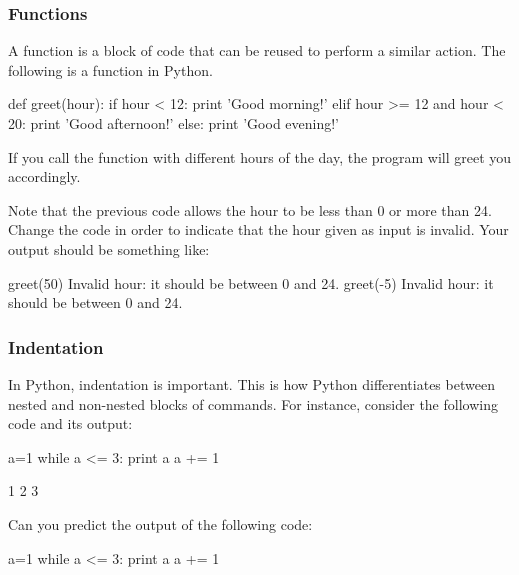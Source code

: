  
\subsubsection{Functions}

A function is a block of code that can be reused to perform a similar action. The following is a function in Python. 

\begin{python}
def greet(hour):
    if hour < 12:
        print 'Good morning!'
    elif hour >= 12 and hour < 20:
        print 'Good afternoon!'
    else:
        print 'Good evening!'
\end{python}

If you call the function  with different hours of the day, the program will greet you accordingly.

\begin{exercise}
 Note that the previous code allows the hour to be less than 0 or more than 24. Change the code in order to indicate that the hour given as input is invalid. Your output should be something like:

\begin{python}
greet(50)
Invalid hour: it should be between 0 and 24.
greet(-5)
Invalid hour: it should be between 0 and 24.
\end{python}

\end{exercise}

\subsubsection{Indentation}

In Python, indentation is important. This is how Python differentiates between
nested and non-nested blocks of commands. For instance, consider the following
code and its output:

\begin{python}
a=1
while a <= 3:
    print a
    a += 1
\end{python}

\begin{python}
1
2
3
\end{python}


\begin{exercise}
Can you predict the output of the following code:

\begin{python}
a=1
while a <= 3:
    print a
a += 1
\end{python}

\end{exercise}

